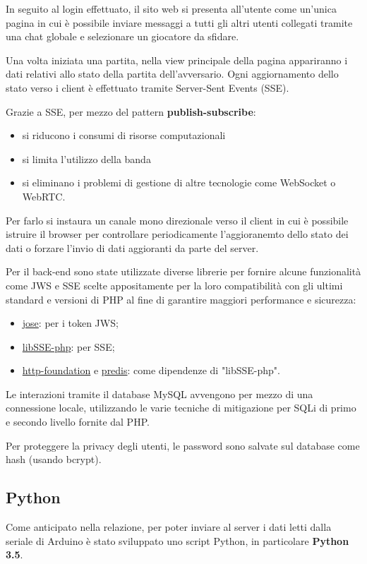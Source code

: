 In seguito al login effettuato, il sito web si presenta all'utente come un'unica pagina in cui è possibile inviare messaggi a tutti gli altri utenti collegati tramite una chat globale e selezionare un giocatore da sfidare. 

Una volta iniziata una partita, nella view principale della pagina appariranno i dati relativi allo stato della partita dell'avversario. Ogni aggiornamento dello stato verso i client è effettuato tramite Server-Sent Events (SSE).

Grazie a SSE, per mezzo del pattern \textbf{publish-subscribe}:
\begin{itemize}
	\item si riducono i consumi di risorse computazionali
	\item si limita l'utilizzo della banda
	\item si eliminano i problemi di gestione di altre tecnologie come WebSocket o WebRTC.
\end{itemize} 
Per farlo si instaura un canale mono direzionale verso il client in cui è possibile istruire il browser per controllare periodicamente l'aggioranemto dello stato dei dati o forzare l'invio di dati aggioranti da parte del server.

Per il back-end sono state utilizzate diverse librerie per fornire alcune funzionalità come JWS e SSE scelte appositamente per la loro compatibilità con gli ultimi standard e versioni di PHP al fine di garantire maggiori performance e sicurezza:
\begin{itemize}
	\item \href{https://github.com/namshi/jose}{jose}: per i token JWS;
	\item \href{https://github.com/licson0729/libSSE-php}{libSSE-php}: per SSE;
	\item \href{https://github.com/symfony/http-foundation}{http-foundation} e \href{https://github.com/nrk/predis}{predis}: come dipendenze di "libSSE-php".
\end{itemize}
Le interazioni tramite il database MySQL avvengono per mezzo di una connessione locale, utilizzando le varie tecniche di mitigazione per SQLi di primo e secondo livello fornite dal PHP.

Per proteggere la privacy degli utenti, le password sono salvate sul database come hash (usando bcrypt).

\subsection{Python}
Come anticipato nella relazione, per poter inviare al server i dati letti dalla seriale di Arduino è stato sviluppato uno script Python, in particolare \textbf{Python 3.5}.

